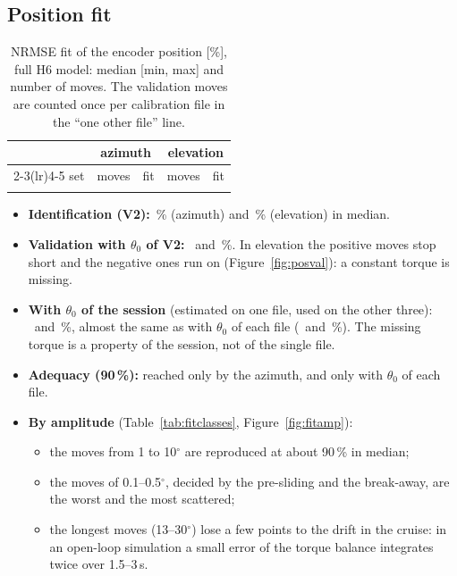 \documentclass[10pt,a4paper]{article}
\numberwithin{equation}{section}
\begin{document}
\subsection{Position fit}
\begin{table}[H]\centering\small
\caption{NRMSE fit of the encoder position [\%], full H6 model: median [min, max] and number of moves. The validation moves are counted once per calibration file in the ``one other file'' line.}\label{tab:fits}
\begin{tabular}{lrlrl}\toprule
& \multicolumn{2}{c}{azimuth} & \multicolumn{2}{c}{elevation} \\ \cmidrule(lr){2-3}\cmidrule(lr){4-5}
set & moves & fit & moves & fit \\ \midrule
\\ \bottomrule
\end{tabular}\end{table}
\begin{itemize}
\item \textbf{Identification (V2):} \fitIdAz\,\% (azimuth) and \fitIdEl\,\% (elevation) in median.
\item \textbf{Validation with $\theta_0$ of V2:} \fitValAz\ and \fitValEl\,\%. In elevation the positive moves stop short and the negative ones run on (Figure~\ref{fig:posval}): a constant torque is missing.
\item \textbf{With $\theta_0$ of the session} (estimated on one file, used on the other three): \fitValSesAz\ and \fitValSesEl\,\%, almost the same as with $\theta_0$ of each file (\fitValSeqAz\ and \fitValSeqEl\,\%). The missing torque is a property of the session, not of the single file.
\item \textbf{Adequacy (90\,\%):} reached only by the azimuth, and only with $\theta_0$ of each file.
\item \textbf{By amplitude} (Table~\ref{tab:fitclasses}, Figure~\ref{fig:fitamp}):
  \begin{itemize}
  \item the moves from 1 to 10$^\circ$ are reproduced at about 90\,\% in median;
  \item the moves of 0.1--0.5$^\circ$, decided by the pre-sliding and the break-away, are the worst and the most scattered;
  \item the longest moves (13--30$^\circ$) lose a few points to the drift in the cruise: in an open-loop simulation a small error of the torque balance integrates twice over 1.5--3\,s.
  \end{itemize}
\end{itemize}
\end{document}
